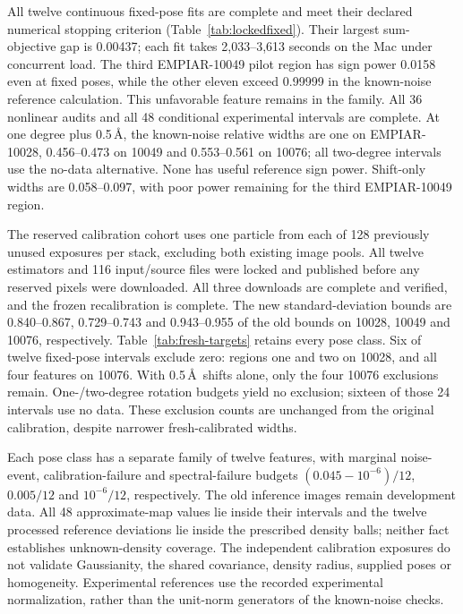 All twelve continuous fixed-pose fits are complete and meet their declared
numerical stopping criterion (Table~\ref{tab:lockedfixed}). Their largest
sum-objective gap is 0.00437; each fit takes 2,033--3,613 seconds on the Mac
under concurrent load. The third EMPIAR-10049 pilot region has sign power
0.0158 even at fixed poses, while the other eleven exceed 0.99999 in the
known-noise reference calculation. This unfavorable feature remains in the
family. All 36 nonlinear audits and all 48 conditional experimental intervals
are complete. At one degree plus 0.5\,\AA, the known-noise relative widths are
one on EMPIAR-10028, 0.456--0.473 on 10049 and 0.553--0.561 on 10076;
all two-degree intervals use the no-data alternative. None has useful
reference sign power. Shift-only widths are 0.058--0.097, with poor power
remaining for the third EMPIAR-10049 region.

The reserved calibration cohort uses one particle from each
of 128 previously unused exposures per stack, excluding both existing image
pools. All twelve estimators and 116 input/source files were locked and
published before any reserved pixels were downloaded. All three downloads are
complete and verified, and the frozen recalibration is complete. The new
standard-deviation bounds are 0.840--0.867, 0.729--0.743 and 0.943--0.955
of the old bounds on 10028, 10049 and 10076, respectively. Table~\ref{tab:fresh-targets}
retains every pose class. Six of twelve fixed-pose intervals exclude zero:
regions one and two on 10028, and all four features on 10076. With 0.5\,\AA\
shifts alone, only the four 10076 exclusions remain. One-/two-degree rotation
budgets yield no exclusion; sixteen of those 24 intervals use no data.
These exclusion counts are unchanged from the original calibration, despite
narrower fresh-calibrated widths.

Each pose class has a separate family of twelve features, with marginal
noise-event, calibration-failure and spectral-failure budgets
$(0.045-10^{-6})/12$, $0.005/12$ and $10^{-6}/12$, respectively.
The old inference images remain development data. All 48 approximate-map
values lie inside their intervals and the twelve processed reference deviations
lie inside the prescribed density balls; neither fact establishes unknown-density
coverage. The independent calibration exposures do not validate Gaussianity,
the shared covariance, density radius, supplied poses or homogeneity.
Experimental references use the recorded experimental normalization, rather
than the unit-norm generators of the known-noise checks.



